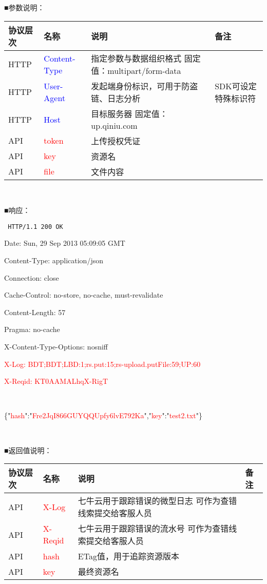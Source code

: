 \documentclass[11pt, oneside]{book}
\newcommand{\qpara}[1]{
\vspace{0.2em}
\begin{spacing}{1.35}
\noindent
#1\par
\end{spacing}
\vspace{0.2em}
}
\newcommand{\qblock}[1]{
\vspace{0.1em}
\noindent
#1\par
\vspace{0.1em}
}
\newcommand{\qtable}[1]{\footnotesize\vspace{0.5em}#1\vspace{0.5em}\normalsize}
\newcommand{\qhttp}[1]{\noindent #1\par}
\begin{document}
\qblock{■\thinspace 参数说明：}
\qtable{
\def\arraystretch{2}
\begin{tabular}{|l|p{7em}|p{19em}|p{7em}|}
\hline
协议层次 & 名称 & 说明 & 备注 \\
\hline
HTTP & \textcolor{blue}{Content-Type} & 指定参数与数据组织格式 \newline 固定值：multipart/form-data & \\
\hline
HTTP & \textcolor{blue}{User-Agent} & 发起端身份标识，可用于防盗链、日志分析 & SDK可设定特殊标识符 \\
\hline
HTTP & \textcolor{blue}{Host} & 目标服务器 \newline 固定值：up.qiniu.com & \\
\hline
API & \textcolor{red}{token} & 上传授权凭证 & \\
\hline
API & \textcolor{red}{key} & 资源名 & \\
\hline
API & \textcolor{red}{file} & 文件内容 & \\
\hline
\end{tabular}
}

\qpara{\ }

\qblock{■\thinspace 响应：}
{
\tt \footnotesize
\qhttp{HTTP/1.1 200 OK}
\qhttp{Date: Sun, 29 Sep 2013 05:09:05 GMT}
\qhttp{Content-Type: application/json}
\qhttp{Connection: close}
\qhttp{Cache-Control: no-store, no-cache, must-revalidate}
\qhttp{Content-Length: 57}
\qhttp{Pragma: no-cache}
\qhttp{X-Content-Type-Options: nosniff}
\qhttp{\textcolor{red}{X-Log: BDT;BDT;LBD:1;rs.put:15;rs-upload.putFile:59;UP:60}}
\qhttp{\textcolor{red}{X-Reqid: KT0AAMALhqX-RigT}}
\qhttp{\ }
\qhttp{\{"\textcolor{red}{hash}":"\textcolor{red}{Fre2JqI866GUYQQUpfy6lvE792Ka}","\textcolor{red}{key}":"\textcolor{red}{test2.txt}"\}}
\qhttp{\ }
}

\qblock{■\thinspace 返回值说明：}
\qtable{
\def\arraystretch{2}
\begin{tabular}{|l|p{7em}|p{19em}|p{7em}|}
\hline
协议层次 & 名称 & 说明 & 备注 \\
\hline
API & \textcolor{red}{X-Log} & 七牛云用于跟踪错误的微型日志 \newline 可作为查错线索提交给客服人员 & \\
\hline
API & \textcolor{red}{X-Reqid} & 七牛云用于跟踪错误的流水号 \newline 可作为查错线索提交给客服人员 & \\
\hline
API & \textcolor{red}{hash} & ETag值，用于追踪资源版本 & \\
\hline
API & \textcolor{red}{key} & 最终资源名 & \\
\hline
\end{tabular}
}
\end{document}
